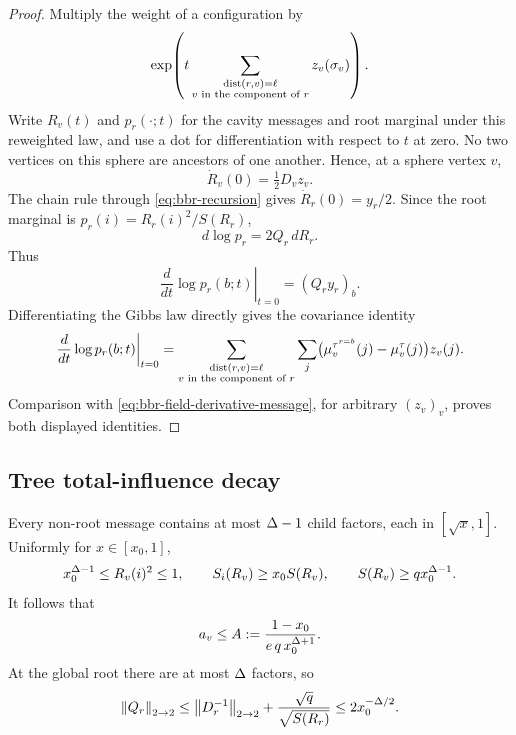 \begin{proof}
Multiply the weight of a configuration by
\[
 \exp\!\left(
   t\sum_{\substack{\operatorname{dist}(r,v)=\ell\\v\text{ in the component of }r}}
   z_v(\sigma_v)\right).
\]
Write $R_v(t)$ and $p_r(\cdot;t)$ for the cavity messages and root
marginal under this reweighted law, and use a dot for differentiation
with respect to $t$ at zero.  No two vertices on this sphere are ancestors
of one another.  Hence, at a
sphere vertex \(v\),
\[
 \dot R_v(0)=\tfrac12D_vz_v.
\]
The chain rule through \eqref{eq:bbr-recursion} gives
\(\dot R_r(0)=y_r/2\).  Since the root marginal is
\(p_r(i)=R_r(i)^2/S(R_r)\),
\[
 d\log p_r=2Q_r\,dR_r.
\]
Thus
\begin{equation}
 \left.\frac d{dt}\log p_r(b;t)\right|_{t=0}=(Q_ry_r)_b.
 \label{eq:bbr-field-derivative-message}
\end{equation}
Differentiating the Gibbs law directly gives the covariance identity
\[
 \left.\frac d{dt}\log p_r(b;t)\right|_{t=0}
 =\sum_{\substack{\operatorname{dist}(r,v)=\ell\\v\text{ in the component of }r}}\sum_j
   \bigl(\mu_v^{\tau^{r=b}}(j)-\mu_v^\tau(j)\bigr)z_v(j).
\]
Comparison with \eqref{eq:bbr-field-derivative-message}, for arbitrary
\((z_v)_v\), proves both displayed identities.
\end{proof}

\subsection{Tree total-influence decay}

Every non-root message contains at most \(\Delta-1\) child factors, each in
\([\sqrt{x},1]\).  Uniformly for \(x\in[x_0,1]\),
\begin{equation}
 x_0^{\Delta-1}\le R_v(i)^2\le1,\qquad
 S_i(R_v)\ge x_0S(R_v),\qquad
 S(R_v)\ge qx_0^{\Delta-1}.
 \label{eq:bbr-message-bounds}
\end{equation}
It follows that
\begin{equation}
 a_v\le A:=\frac{1-x_0}{e\,q\,x_0^{\Delta+1}}.
 \label{eq:bbr-A}
\end{equation}
At the global root there are at most \(\Delta\) factors, so
\begin{equation}
 \left\|Q_r\right\|_{2\to2}
 \le\left\|D_r^{-1}\right\|_{2\to2}
   +\frac{\sqrt q}{\sqrt{S(R_r)}}
 \le2x_0^{-\Delta/2}.
 \label{eq:bbr-Q-bound}
\end{equation}

